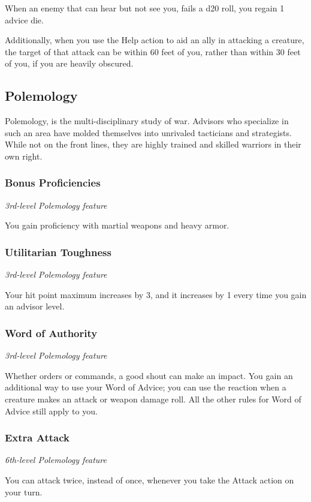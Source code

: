 \documentclass[letterpaper,openany,twoside,twocolumn]{book}
\begin{document}
	When an enemy that can hear but not see you, fails a d20 roll, you regain 1 advice die.
	
	Additionally, when you use the Help action to aid an ally in attacking a creature, the target of that attack can be within 60 feet of you, rather than within 30 feet of you, if you are heavily obscured.
	
	\subsection*{Polemology}
	Polemology, is the multi-disciplinary study of war. Advisors who specialize in such an area have molded themselves into unrivaled tacticians and strategists. While not on the front lines, they are highly trained and skilled warriors in their own right.
	
	\subsubsection*{Bonus Proficiencies}
	\textnormal{\textit{3rd-level Polemology feature}}
	
	You gain proficiency with martial weapons and heavy armor.
	
	\subsubsection*{Utilitarian Toughness}
	\textnormal{\textit{3rd-level Polemology feature}}
	
	Your hit point maximum increases by 3, and it increases by 1 every time you gain an advisor level.
	
	\subsubsection*{Word of Authority}
	\textnormal{\textit{3rd-level Polemology feature}}
	
	Whether orders or commands, a good shout can make an impact. You gain an additional way to use your Word of Advice; you can use the reaction when a creature makes an attack or weapon damage roll. All the other rules for Word of Advice still apply to you.
	
	\subsubsection*{Extra Attack}
	\textnormal{\textit{6th-level Polemology feature}}
	
	You can attack twice, instead of once, whenever you take the Attack action on your turn.
	
\end{document}
